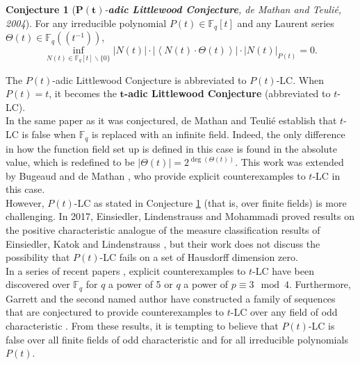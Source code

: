 \documentclass{article}
\theoremstyle{definition}
\newtheorem{conjecture}[theorem]{Conjecture}
\newcommand{\F}{\mathbb{F}}
\numberwithin{equation}{subsection}
\begin{document}
\begin{conjecture}[\textit{$\mathbf{P(t)}$-\textbf{adic Littlewood Conjecture}, de Mathan and Teulié, 2004}]\label{tlc}
        For any irreducible polynomial $P(t)\in{\F_q}[t]$ and any Laurent series $\Theta(t)\in{\F_q}\left(\!\left(t^{-1}\right)\!\right)$, \[\inf_{N(t)\in{\F_q}[t]\backslash\{0\}}|N(t)|\cdot \left|\left\langle N(t)\cdot \Theta(t)\right\rangle\right|\cdot |N(t)|_{P(t)}=0.\]
    \end{conjecture}
 \noindent The $P(t)$-adic Littlewood Conjecture is abbreviated to $P(t)$-LC. When $P(t)=t$, it becomes the $\mathbf{t}$\textbf{-adic Littlewood Conjecture} (abbreviated to $t$-LC). \\
 
 \noindent In the same paper as it was conjectured, de Mathan and Teulié establish that $t$-LC is false when ${\F_q}$ is replaced with an infinite field. Indeed, the only difference in how the function field set up is defined in this case is found in the absolute value, which is redefined to be $|\Theta(t)|=2^{\deg(\Theta(t))}$. This work was extended by Bugeaud and de Mathan \cite{CE}, who provide explicit counterexamples to $t$-LC in this case. \\
 
 \noindent However, $P(t)$-LC as stated in Conjecture \ref{tlc} (that is, over finite fields) is more challenging. In 2017, Einsiedler, Lindenstrauss
and Mohammadi \cite{PC} proved results on the positive characteristic analogue of the measure classification results of Einsiedler, Katok and Lindenstrauss \cite{EKL}, but their work does not discuss the possibility that $P(t)$-LC fails on a set of Hausdorff dimension zero. \\

\noindent In a series of recent papers \cite{Faustin, GaRo, P(t)_LC}, explicit counterexamples to $t$-LC have been discovered over $\F_q$ for $q$ a power of 5 or $q$ a power of $p\equiv 3\mod 4$. Furthermore, Garrett and the second named author have constructed a family of sequences that are conjectured to provide counterexamples to $t$-LC over any field of odd characteristic \cite[Conjecture 1.8]{GaRo}. From these results, it is tempting to believe that $P(t)$-LC is false over all finite fields of odd characteristic and for all irreducible polynomials $P(t)$. 
\end{document}

